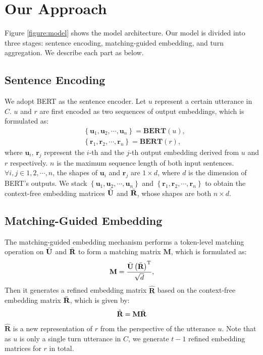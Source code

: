 \documentclass[11pt]{article}
\begin{document}
\section{Our Approach}
Figure \ref{figure:model} shows the model architecture. 
Our model is divided into three stages: sentence encoding, matching-guided embedding, and turn aggregation.
We describe each part as below.



\subsection{Sentence Encoding}
We adopt BERT \cite{bert} as the sentence encoder.
Let $u$ represent a certain utterance in $C$.
$u$ and $r$ are first encoded as two sequences of output embeddings, which is formulated as:
\begin{align}
    & \left \{\textbf{u}_{1}, \textbf{u}_{2}, \cdots, \textbf{u}_{n} \right \} = \textbf{BERT}(u), \\
    & \left \{\textbf{r}_{1}, \textbf{r}_{2}, \cdots, \textbf{r}_{n} \right \} = \textbf{BERT}(r),
\end{align}
where $\textbf{u}_{i}$, $\textbf{r}_{j}$ represent the $i$-th and the $j$-th output embedding derived from $u$ and $r$ respectively.
$n$ is the maximum sequence length of both input sentences.
$\forall{i, j} \in {1, 2, \cdots, n}$, the shapes of $\textbf{u}_{i}$ and $\textbf{r}_{j}$ are $1 \times d$, where $d$ is the dimension of BERT's outputs.
We stack $\left \{\textbf{u}_{1}, \textbf{u}_{2}, \cdots, \textbf{u}_{n}\right \}$ and $\left \{\textbf{r}_{1}, \textbf{r}_{2}, \cdots, \textbf{r}_{n}\right \}$ to obtain the context-free embedding matrices $\Bar{\textbf{U}}$ and $\Bar{\textbf{R}}$, whose shapes are both $n \times d$.

\subsection{Matching-Guided Embedding}
The matching-guided embedding mechanism performs a token-level matching operation on $\Bar{\textbf{U}}$ and $\Bar{\textbf{R}}$ to form a matching matrix $\textbf{M}$, which is formulated as:
\begin{align}
    \textbf{M} = \frac{\Bar{\textbf{U}} \left ( \Bar{\textbf{R}} \right )^\mathrm{T}}{\sqrt{d}},
\end{align}
Then it generates a refined embedding matrix $\hat{\textbf{R}}$ based on the context-free embedding matrix $\Bar{\textbf{R}}$, which is given by:
\begin{align}
    \hat{\textbf{R}} = \textbf{M} \Bar{\textbf{R}}
\end{align}
$\hat{\textbf{R}}$ is a new representation of $r$ from the perspective of the utterance $u$.
Note that as $u$ is only a single turn utterance in $C$, we generate $t-1$ refined embedding matrices for $r$ in total.
\end{document}
